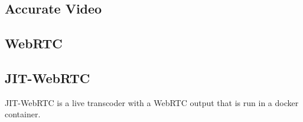 \documentclass[12pt,a4paper]{article}
\begin{document}
\subsection{Accurate Video} \label{subsection_accuratevideo}


\subsection{WebRTC}



\subsection{JIT-WebRTC}

JIT-WebRTC is a live transcoder with a WebRTC output that is run in a docker container.
\end{document}
